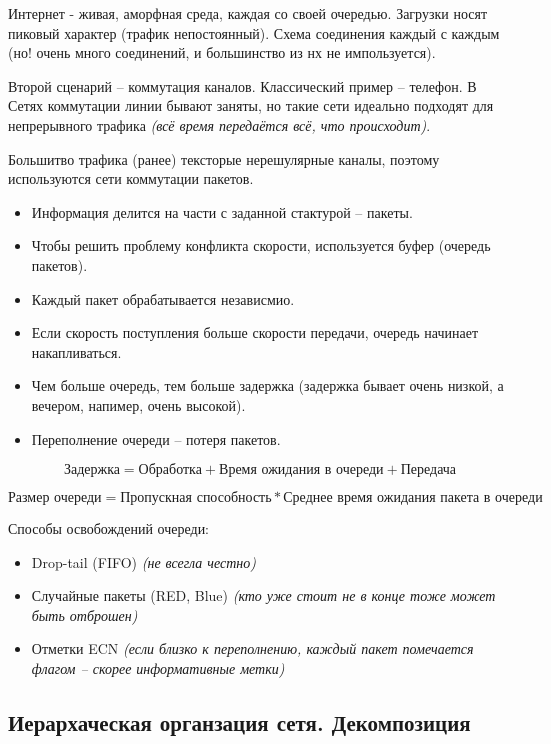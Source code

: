 Интернет - живая, аморфная среда, каждая со своей очередью. Загрузки носят пиковый характер (трафик непостоянный). Схема соединения каждый с каждым (но! очень много соединений, и большинство из нх не импользуется).

Второй сценарий – коммутация каналов. Классический пример – телефон.
В Сетях коммутации линии бывают заняты, но такие сети идеально подходят для непрерывного трафика \textit{(всё время передаётся всё, что происходит)}.

Большитво трафика (ранее) тексторые нерешулярные каналы, поэтому используются сети коммутации пакетов.

\begin{itemize}
    \item Информация делится на части с заданной стактурой – пакеты.
    \item Чтобы решить проблему конфликта скорости, используется буфер (очередь пакетов).
    \item Каждый пакет обрабатывается независмио.
    \item Если скорость поступления больше скорости передачи, очередь начинает накапливаться.
    \item Чем больше очередь, тем больше задержка (задержка бывает очень низкой, а вечером, напимер, очень высокой).
    \item Переполнение очереди – потеря пакетов.
\end{itemize}

\[
\text{Задержка} = \text{Обработка} + \text{Время ожидания в очереди} + \text{Передача}
\]

\[
\text{Размер очереди} = \text{Пропускная способность} * \text{Среднее время ожидания пакета в очереди}
\]

Способы освобождений очереди:
\begin{itemize}
    \item Drop-tail (FIFO) \textit{(не всегла честно)}
    \item Случайные пакеты (RED, Blue) \textit{(кто уже стоит не в конце тоже может быть отброшен)}
    \item Отметки ECN \textit{(если близко к переполнению, каждый пакет помечается флагом – скорее информативные метки)}
\end{itemize}

\subsection{Иерархаческая органзация сетя. Декомпозиция}

